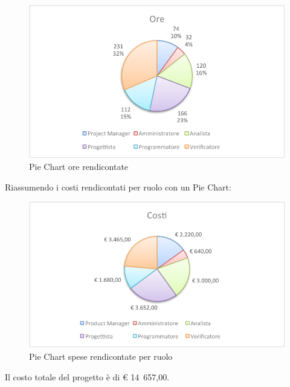 			\begin{figure}[H]\centering
				\includegraphics[width=\textwidth]{PianoDiProgetto/Pics/ChartTotOreRendic.pdf}
				\caption{Pie Chart ore rendicontate}
			\end{figure}
			Riassumendo i costi rendicontati per ruolo con un Pie Chart:
			\begin{figure}[H]\centering
				\includegraphics[width=\textwidth]{PianoDiProgetto/Pics/ChartTotCostiRendic.pdf}
				\caption{Pie Chart spese rendicontate per ruolo}
			\end{figure}
		Il costo totale del progetto è di \euro{} 14~657,00.